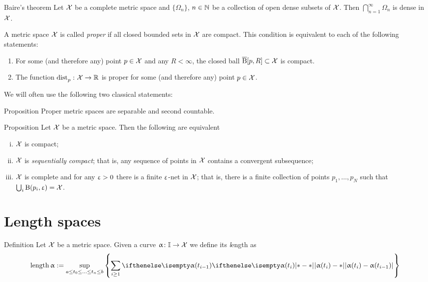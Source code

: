 \begin{thm}{Baire's theorem}
Let $\mathcal{X}$ be a complete metric space 
and $\{\Omega_n\}$, $n\in \NN$ be a collection of open dense subsets of $\mathcal{X}$.
Then $\bigcap_{n=1}^\infty\Omega_n$ is dense in $\mathcal{X}$.
\end{thm}
 

A metric space $\mathcal{X}$ is called \emph{proper} if all closed bounded sets in $\mathcal{X}$ are compact. 
This condition is equivalent to each of the following statements:
\begin{enumerate}
\item For some (and therefore any) point $p\in \spc{X}$ and any $R<\infty$, 
the closed ball $\cBall[p,R]\subset\spc{X}$ is compact. 
\item The function $\distfun{p}{}{}\:\spc{X}\to\RR$ is proper for some (and therefore any) point $p\in \spc{X}$.
\end{enumerate}

We will often use the following two classical statements:

\begin{thm}{Proposition}
Proper metric spaces are separable and second countable.
\end{thm}



\begin{thm}{Proposition}\label{compact=seq-compact}
Let $\mathcal{X}$ be a metric space. Then the following are equivalent
\begin{enumerate}[i)]
\item $\mathcal{X}$ is compact;
\item $\mathcal{X}$ is \emph{sequentially compact}; that is, any sequence of points in $\mathcal{X}$ contains a convergent subsequence;
\item $\mathcal{X}$ is complete and for any $\upvarepsilon>0$ there is a finite $\upvarepsilon$-net in $\mathcal{X}$; that is, there is a finite collection of points $p_1,\ldots,p_{N}$ such that $\bigcup_i\mathrm{B}{}(p_i,\upvarepsilon)=\mathcal{X}$.
\end{enumerate}
\end{thm}

\section{Length spaces}\label{sec:intrinsic}

\begin{thm}{Definition}\label{def:length}
Let $\mathcal{X}$ be a metric space.  Given a curve $\alpha\: \II\to \spc{X}$ we define its {\emph length} as 
\[
\length \alpha \df \sup_{a\le t_0\le\ldots\le t_n\le b}\left\{\sum_{i\ge 1} \dist{\alpha(t_i)}{\alpha (t_{i-1})}{}\right\}
\]
\end{thm}

